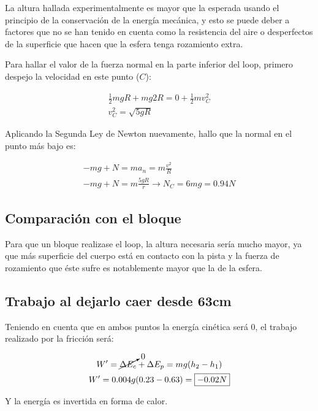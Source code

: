 \documentclass[]{scrartcl}
\begin{document}
La altura hallada experimentalmente es mayor que la esperada usando el principio de la conservación de la energía mecánica, y esto se puede deber a factores que no se han tenido en cuenta como la resistencia del aire o desperfectos de la superficie que hacen que la esfera tenga rozamiento extra.

Para hallar el valor de la fuerza normal en la parte inferior del loop, primero despejo la velocidad en este punto ($C$):

\begin{gather*}
    \frac{1}{2}mgR+mg2R=0+\frac{1}{2}mv^{2}_{C}\\
    v^2_{C}=\sqrt{5gR}
\end{gather*}

Aplicando la Segunda Ley de Newton nuevamente, hallo que la normal en el punto más bajo es:

\begin{gather*}
    -mg+N=ma_{n}=m\frac{v^{2}}{R}\\
    -mg+N=m\frac{5gR}{r} \rightarrow N_{C}=6mg = \boxed{0.94 N}
\end{gather*}

\subsection{Comparación con el bloque}

Para que un bloque realizase el loop, la altura necesaria sería mucho mayor, ya que más superficie del cuerpo está en contacto con la pista y la fuerza de rozamiento que éste sufre es notablemente mayor que la de la esfera.

\subsection{Trabajo al dejarlo caer desde 63cm}

Teniendo en cuenta que en ambos puntos la energía cinética será 0, el trabajo realizado por la fricción será:

\begin{gather*}
    W'=\cancelto{0}{\Delta E_{c}} + \Delta E_{p} = mg(h_{2}-h_{1})\\
    W'=0.004g(0.23-0.63) = \boxed{-0.02 N}
\end{gather*}

Y la energía es invertida en forma de calor.
\end{document}
